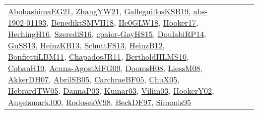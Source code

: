 {\begin{longtable}{llp{6cm}p{6cm}p{6cm}}
\href{articles/AbohashimaEG21.pdf}{AbohashimaEG21}\cite{AbohashimaEG21}, \href{articles/ZhangYW21.pdf}{ZhangYW21}\cite{ZhangYW21}, \href{papers/GalleguillosKSB19.pdf}{GalleguillosKSB19}\cite{GalleguillosKSB19}, \href{articles/abs-1902-01193.pdf}{abs-1902-01193}\cite{abs-1902-01193}, \href{papers/BenediktSMVH18.pdf}{BenediktSMVH18}\cite{BenediktSMVH18}, \href{papers/He0GLW18.pdf}{He0GLW18}\cite{He0GLW18}, \href{papers/Hooker17.pdf}{Hooker17}\cite{Hooker17}, \href{papers/HechingH16.pdf}{HechingH16}\cite{HechingH16}, \href{papers/SzerediS16.pdf}{SzerediS16}\cite{SzerediS16}, \href{papers/cpaior-GayHS15.pdf}{cpaior-GayHS15}\cite{cpaior-GayHS15}, \href{papers/DoulabiRP14.pdf}{DoulabiRP14}\cite{DoulabiRP14}, \href{papers/GuSS13.pdf}{GuSS13}\cite{GuSS13}, \href{papers/HeinzKB13.pdf}{HeinzKB13}\cite{HeinzKB13}, \href{papers/SchuttFS13.pdf}{SchuttFS13}\cite{SchuttFS13}, \href{papers/HeinzB12.pdf}{HeinzB12}\cite{HeinzB12}, \href{papers/BonfiettiLBM11.pdf}{BonfiettiLBM11}\cite{BonfiettiLBM11}, \href{papers/ChapadosJR11.pdf}{ChapadosJR11}\cite{ChapadosJR11}, \href{papers/BertholdHLMS10.pdf}{BertholdHLMS10}\cite{BertholdHLMS10}, \href{papers/CobanH10.pdf}{CobanH10}\cite{CobanH10}, \href{papers/Acuna-AgostMFG09.pdf}{Acuna-AgostMFG09}\cite{Acuna-AgostMFG09}, \href{papers/DoomsH08.pdf}{DoomsH08}\cite{DoomsH08}, \href{articles/LiessM08.pdf}{LiessM08}\cite{LiessM08}, \href{papers/AkkerDH07.pdf}{AkkerDH07}\cite{AkkerDH07}, \href{papers/AbrilSB05.pdf}{AbrilSB05}\cite{AbrilSB05}, \href{papers/CarchraeBF05.pdf}{CarchraeBF05}\cite{CarchraeBF05}, \href{papers/ChuX05.pdf}{ChuX05}\cite{ChuX05}, \href{papers/HebrardTW05.pdf}{HebrardTW05}\cite{HebrardTW05}, \href{papers/DannaP03.pdf}{DannaP03}\cite{DannaP03}, \href{papers/Kumar03.pdf}{Kumar03}\cite{Kumar03}, \href{papers/Vilim03.pdf}{Vilim03}\cite{Vilim03}, \href{papers/HookerY02.pdf}{HookerY02}\cite{HookerY02}, \href{papers/AngelsmarkJ00.pdf}{AngelsmarkJ00}\cite{AngelsmarkJ00}, \href{papers/RodosekW98.pdf}{RodosekW98}\cite{RodosekW98}, \href{papers/BeckDF97.pdf}{BeckDF97}\cite{BeckDF97}, \href{papers/Simonis95.pdf}{Simonis95}\cite{Simonis95}\\

\end{longtable}}
